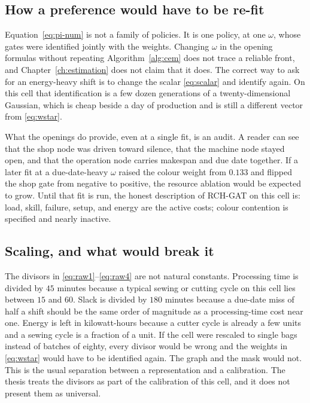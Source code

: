 \subsection{How a preference would have to be re-fit}

Equation~\eqref{eq:pi-num} is not a family of policies. It is one policy, at one \(\omega\), whose gates were identified jointly with the weights. Changing \(\omega\) in the opening formulas without repeating Algorithm~\ref{alg:cem} does not trace a reliable front, and Chapter~\ref{ch:estimation} does not claim that it does. The correct way to ask for an energy-heavy shift is to change the scalar \eqref{eq:scalar} and identify again. On this cell that identification is a few dozen generations of a twenty-dimensional Gaussian, which is cheap beside a day of production and is still a different vector from \eqref{eq:wstar}.

What the openings do provide, even at a single fit, is an audit. A reader can see that the shop node was driven toward silence, that the machine node stayed open, and that the operation node carries makespan and due date together. If a later fit at a due-date-heavy \(\omega\) raised the colour weight from \(0.133\) and flipped the shop gate from negative to positive, the resource ablation would be expected to grow. Until that fit is run, the honest description of RCH-GAT on this cell is: load, skill, failure, setup, and energy are the active costs; colour contention is specified and nearly inactive.

\subsection{Scaling, and what would break it}

The divisors in \eqref{eq:raw1}--\eqref{eq:raw4} are not natural constants. Processing time is divided by \(45\) minutes because a typical sewing or cutting cycle on this cell lies between \(15\) and \(60\). Slack is divided by \(180\) minutes because a due-date miss of half a shift should be the same order of magnitude as a processing-time cost near one. Energy is left in kilowatt-hours because a cutter cycle is already a few units and a sewing cycle is a fraction of a unit. If the cell were rescaled to single bags instead of batches of eighty, every divisor would be wrong and the weights in \eqref{eq:wstar} would have to be identified again. The graph and the mask would not. This is the usual separation between a representation and a calibration. The thesis treats the divisors as part of the calibration of this cell, and it does not present them as universal.

